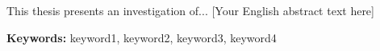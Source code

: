 \noindent This thesis presents an investigation of... [Your English abstract text here]

\vspace{0.5cm}

\noindent \textbf{Keywords:} keyword1, keyword2, keyword3, keyword4

